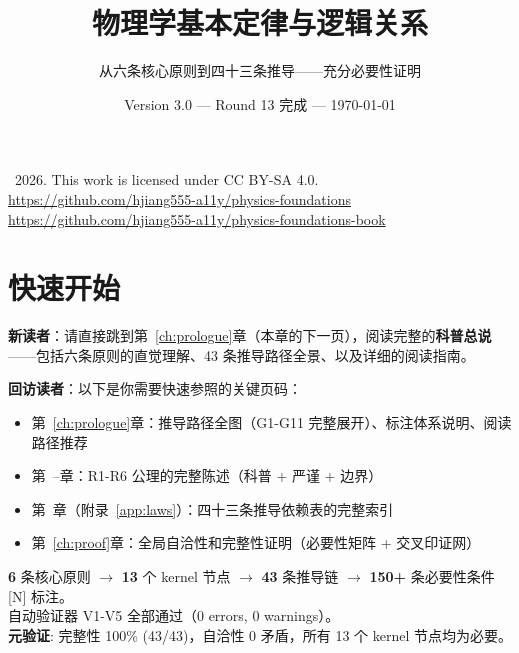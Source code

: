 \documentclass[11pt,a4paper,openany]{book}
\title{物理学基本定律与逻辑关系}
\author{从六条核心原则到四十三条推导——充分必要性证明}
\date{Version 3.0 — Round 13 完成 — \today}
\begin{document}
\frontmatter
\maketitle

\thispagestyle{empty}
\vspace*{\fill}
\begin{center}
  \textcopyright\ 2026. This work is licensed under CC BY-SA 4.0. \\
  \url{https://github.com/hjiang555-a11y/physics-foundations} \\
  \url{https://github.com/hjiang555-a11y/physics-foundations-book}
\end{center}
\vspace*{\fill}
\clearpage

\chapter*{快速开始}

\textbf{新读者}：请直接跳到第~\ref{ch:prologue}章（本章的下一页），阅读完整的\textbf{科普总说}——包括六条原则的直觉理解、43 条推导路径全景、以及详细的阅读指南。

\textbf{回访读者}：以下是你需要快速参照的关键页码：
\begin{itemize}
  \item 第~\ref{ch:prologue}章：推导路径全图（G1-G11 完整展开）、标注体系说明、阅读路径推荐
  \item 第~\pageref{ch:r1}--\pageref{ch:r6}章：R1-R6 公理的完整陈述（科普 + 严谨 + 边界）
  \item 第~\pageref{app:laws}章（附录~\ref{app:laws}）：四十三条推导依赖表的完整索引
  \item 第~\ref{ch:proof}章：全局自洽性和完整性证明（必要性矩阵 + 交叉印证网）
\end{itemize}

\begin{notebox}[关键数字]
  \textbf{6} 条核心原则 $\to$ \textbf{13} 个 kernel 节点 $\to$ \textbf{43} 条推导链 $\to$ \textbf{150+} 条必要性条件 [N] 标注。\\
  自动验证器 V1-V5 全部通过（0 errors, 0 warnings）。\\
  \textbf{元验证}: 完整性 100\% (43/43)，自洽性 0 矛盾，所有 13 个 kernel 节点均为必要。
\end{notebox}
\end{document}
